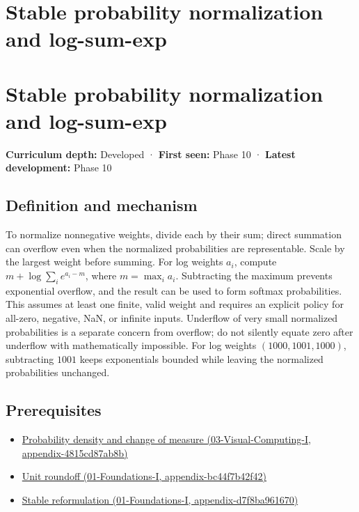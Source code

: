 \hypertarget{appendix-d580b422240f}{}
\section*{Stable probability normalization and log-sum-exp}
\section{Stable probability normalization and log-sum-exp}\label{stable-probability-normalization-and-log-sum-exp}

\textbf{Curriculum depth:} Developed · \textbf{First seen:} Phase 10 · \textbf{Latest development:} Phase 10

\subsection{Definition and mechanism}\label{definition-and-mechanism}

To normalize nonnegative weights, divide each by their sum; direct summation can overflow even when the normalized probabilities are representable. Scale by the largest weight before summing. For log weights \(a_i\), compute \(m+\log\sum_i e^{a_i-m}\), where \(m=\max_i a_i\). Subtracting the maximum prevents exponential overflow, and the result can be used to form softmax probabilities. This assumes at least one finite, valid weight and requires an explicit policy for all-zero, negative, NaN, or infinite inputs. Underflow of very small normalized probabilities is a separate concern from overflow; do not silently equate zero after underflow with mathematically impossible. For log weights \((1000,1001,1000)\), subtracting \(1001\) keeps exponentials bounded while leaving the normalized probabilities unchanged.

\subsection{Prerequisites}\label{prerequisites}

\begin{itemize}
\tightlist
\item
  \href{}{Probability density and change of measure (03-Visual-Computing-I, appendix-4815cd87ab8b)}
\item
  \href{}{Unit roundoff (01-Foundations-I, appendix-bc44f7b42f42)}
\item
  \href{}{Stable reformulation (01-Foundations-I, appendix-d7f8ba961670)}
\end{itemize}

